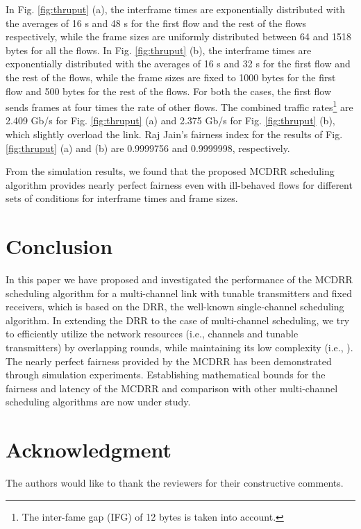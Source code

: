 \documentclass[conference,letterpaper]{IEEEtran}
\begin{document}
In Fig. \ref{fig:thruput} (a), the interframe times are exponentially
distributed with the averages of 16 s and 48 s for the first flow and
the rest of the flows respectively, while the frame sizes are uniformly
distributed between 64 and 1518 bytes for all the flows. In Fig.
\ref{fig:thruput} (b), the interframe times are exponentially distributed with
the averages of 16 s and 32 s for the first flow and the rest of the
flows, while the frame sizes are fixed to 1000 bytes for the first flow and 500
bytes for the rest of the flows. For both the cases, the first flow sends frames
at four times the rate of other flows. The combined traffic rates\footnote{The
  inter-fame gap (IFG) of 12 bytes is taken into account.} are 2.409 Gb/s for
Fig. \ref{fig:thruput} (a) and 2.375 Gb/s for Fig. \ref{fig:thruput} (b), which
slightly overload the link. Raj Jain's fairness index \cite{Jain:84} for the
results of Fig. \ref{fig:thruput} (a) and (b) are 0.9999756 and 0.9999998,
respectively.

From the simulation results, we found that the proposed MCDRR scheduling
algorithm provides nearly perfect fairness even with ill-behaved flows for
different sets of conditions for interframe times and frame sizes.

\section{Conclusion}
In this paper we have proposed and investigated the performance of the MCDRR
scheduling algorithm for a multi-channel link with tunable transmitters and
fixed receivers, which is based on the DRR, the well-known single-channel
scheduling algorithm. In extending the DRR to the case of multi-channel
scheduling, we try to efficiently utilize the network resources (i.e., channels
and tunable transmitters) by overlapping rounds, while maintaining its low
complexity (i.e., ). The nearly perfect fairness provided by the MCDRR has
been demonstrated through simulation experiments. Establishing mathematical
bounds for the fairness and latency of the MCDRR and comparison with other
multi-channel scheduling algorithms are now under study.

\section{Acknowledgment}
The authors would like to thank the reviewers for their constructive comments.
\end{document}
